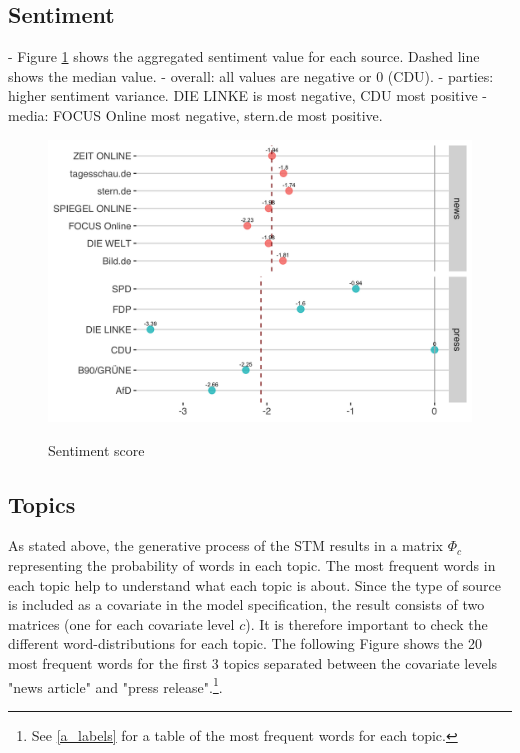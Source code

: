 \documentclass[12pt,a4paper,notitlepage]{article}
\begin{document}
\subsection{Sentiment}

- Figure \ref{fig_sentiment} shows the aggregated sentiment value for each source. Dashed line shows the median value. 
- overall: all values are negative or 0 (CDU).
- parties: higher sentiment variance. DIE LINKE is most negative, CDU most positive
- media: FOCUS Online most negative, stern.de most positive. 

\begin{figure}[H]
\begin{center}
	\caption{Sentiment score }
	\includegraphics[width=.8\textwidth]{../figs/sentiment}
	\label{fig_sentiment}
	\end{center}
\end{figure}



\subsection{Topics} 

As stated above, the generative process of the STM results in a matrix $\Phi_c$ representing the probability of words in each topic. The most frequent words in each topic help to understand what each topic is about. Since the type of source is included as a covariate in the model specification, the result consists of two matrices (one for each covariate level $c$). It is therefore important to check the different word-distributions for each topic. The following Figure shows the 20 most frequent words for the first 3 topics separated between the covariate levels "news article" and "press release".\footnote{See \ref{a_labels} for a table of the most frequent words for each topic.}.
\end{document}
